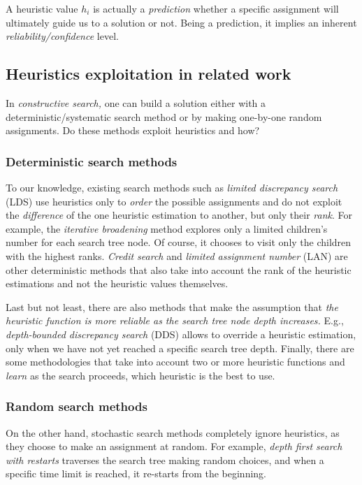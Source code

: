 \documentclass{ws-ijait}
\begin{document}
A heuristic value $h_i$ is actually a \emph{prediction}
whether a specific assignment will ultimately guide us to a
solution or not. Being a prediction, it implies an inherent
\emph{reliability\slash confidence} level.

\subsection{Heuristics exploitation in related work}

In \emph{constructive search,} one can build a solution
either with a deterministic\slash systematic search method
or by making one-by-one random assignments. Do these methods
exploit heuristics and how?

\subsubsection{Deterministic search
               methods\label{deterministic}}

To our knowledge, existing search methods such as
\emph{limited discrepancy search} (LDS) use heuristics only
to \emph{order} the possible assignments and do not exploit
the \emph{difference} of the one heuristic estimation to
another, but only their \emph{rank}.\cite{lds} For example,
the \emph{iterative broadening} method explores only a
limited children's number for each search tree
node.\cite{ibroad} Of course, it chooses to visit only the
children with the highest ranks. \emph{Credit
search}\cite{dbs} and \emph{limited assignment number}
(LAN)\cite{lan} are other deterministic methods that also
take into account the rank of the heuristic estimations and
not the heuristic values themselves.

Last but not least, there are also methods that make the
assumption that \emph{the heuristic function is more
reliable as the search tree node depth increases.} E.g.,
\emph{depth-bounded discrepancy search} (DDS) allows to
override a heuristic estimation, only when we have not yet
reached a specific search tree depth.\cite{dds} Finally,
there are some methodologies that take into account two or
more heuristic functions and \emph{learn} as the search
proceeds, which heuristic is the best to use.\cite{learn}

\subsubsection{Random search methods\label{random}}

On the other hand, stochastic search methods completely
ignore heuristics, as they choose to make an assignment at
random.\cite{heuristics} For example, \emph{depth first
search with restarts} traverses the search tree making
random choices, and when a specific time limit is reached,
it re-starts from the beginning.
\end{document}
